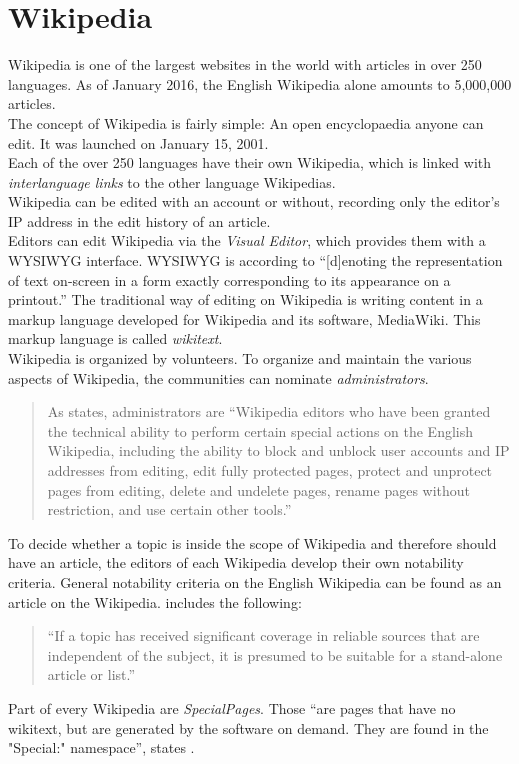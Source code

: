 \section{Wikipedia}
Wikipedia is one of the largest websites in the world with articles in over 250 languages. As of January 2016, the English Wikipedia alone amounts to 5,000,000 articles. \citep{wiki:32} \\
The concept of Wikipedia is fairly simple: An open encyclopaedia anyone can edit. It was launched on January 15, 2001. \citep{wiki:31} \\
Each of the over 250 languages have their own Wikipedia, which is linked with \textit{interlanguage links} to the other language Wikipedias. \\
Wikipedia can be edited with an account or without, recording only the editor's IP address in the edit history of an article. \\
Editors can edit Wikipedia via the \textit{Visual Editor}, which provides them with a WYSIWYG interface. WYSIWYG is according to \citet{wysiwyg} ``[d]enoting the representation of text on-screen in a form exactly corresponding to its appearance on a printout.'' The traditional way of editing on Wikipedia is writing content in a markup language developed for Wikipedia and its software, MediaWiki. This markup language is called \textit{wikitext}. \\
Wikipedia is organized by volunteers. To organize and maintain the various aspects of Wikipedia, the communities can nominate \textit{administrators}.
\begin{quote}
 As \citet{wiki:10} states, administrators are ``Wikipedia editors who have been granted the technical ability to perform certain special actions on the English Wikipedia, including the ability to block and unblock user accounts and IP addresses from editing, edit fully protected pages, protect and unprotect pages from editing, delete and undelete pages, rename pages without restriction, and use certain other tools.''
\end{quote}

To decide whether a topic is inside the scope of Wikipedia and therefore should have an article, the editors of each Wikipedia develop their own notability criteria. General notability criteria on the English Wikipedia can be found as an article on the Wikipedia. \citet{wiki:11} includes the following: 
\begin{quote}
 ``If a topic has received significant coverage in reliable sources that are independent of the subject, it is presumed to be suitable for a stand-alone article or list.''
\end{quote}

Part of every Wikipedia are \textit{SpecialPages}. Those ``are pages that have no wikitext, but are generated by the software on demand. They are found in the "Special:" namespace'', states \citet{wiki:12}.

